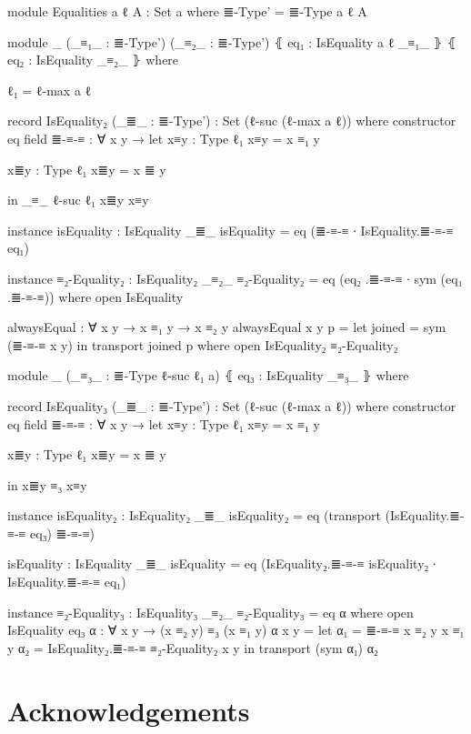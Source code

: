 \documentclass{article}
\begin{document}
\begin{code}
module Equalities {a ℓ} {A : Set a} where
  ≣-Type' = ≣-Type {a} {ℓ} {A}

  module _
    (_≡₁_ : ≣-Type')
    (_≡₂_ : ≣-Type')
    ⦃ eq₁ : IsEquality {a} {ℓ} _≡₁_ ⦄
    ⦃ eq₂ : IsEquality _≡₂_ ⦄
    where

    ℓ₁ = ℓ-max a ℓ

    record IsEquality₂ (_≣_ : ≣-Type') : Set (ℓ-suc (ℓ-max a ℓ)) where
      constructor eq
      field
        ≣-≡-≡ : ∀ {x y} → let
          x≡y : Type ℓ₁
          x≡y = x ≡₁ y

          x≣y : Type ℓ₁
          x≣y = x ≣ y

          in _≡_ {ℓ-suc ℓ₁} x≣y x≡y

      instance
        isEquality : IsEquality _≣_
        isEquality = eq (≣-≡-≡ ∙ IsEquality.≣-≡-≡ eq₁)

    instance
      ≡₂-Equality₂ : IsEquality₂ _≡₂_
      ≡₂-Equality₂ = eq (eq₂ .≣-≡-≡ ∙ sym (eq₁ .≣-≡-≡))
        where open IsEquality

    alwaysEqual : ∀ {x y} →  x ≡₁ y → x ≡₂ y
    alwaysEqual {x} {y} p =
      let joined = sym (≣-≡-≡ {x} {y})
      in transport joined p
      where open IsEquality₂ ≡₂-Equality₂

    module _
      (_≡₃_ : ≣-Type {ℓ-suc ℓ₁} {a})
      ⦃ eq₃ : IsEquality _≡₃_ ⦄
      where

      record IsEquality₃ (_≣_ : ≣-Type') : Set (ℓ-suc (ℓ-max a ℓ)) where
        constructor eq
        field
          ≣-≡-≡ : ∀ {x y} → let
            x≡y : Type ℓ₁
            x≡y = x ≡₁ y

            x≣y : Type ℓ₁
            x≣y = x ≣ y

            in x≣y ≡₃ x≡y

        instance
          isEquality₂ : IsEquality₂ _≣_
          isEquality₂ = eq (transport (IsEquality.≣-≡-≡ eq₃) ≣-≡-≡)

          isEquality : IsEquality _≣_
          isEquality = eq (IsEquality₂.≣-≡-≡ isEquality₂ ∙ IsEquality.≣-≡-≡ eq₁)

      instance
        ≡₂-Equality₃ : IsEquality₃ _≡₂_
        ≡₂-Equality₃ = eq α
          where
            open IsEquality eq₃
            α : ∀ {x y} → (x ≡₂ y) ≡₃ (x ≡₁ y)
            α {x} {y} = let
              α₁ = ≣-≡-≡ {x ≡₂ y} {x ≡₁ y}
              α₂ = IsEquality₂.≣-≡-≡ ≡₂-Equality₂ {x} {y}
              in transport (sym α₁) α₂

\end{code}

\section*{Acknowledgements}



\end{document}
